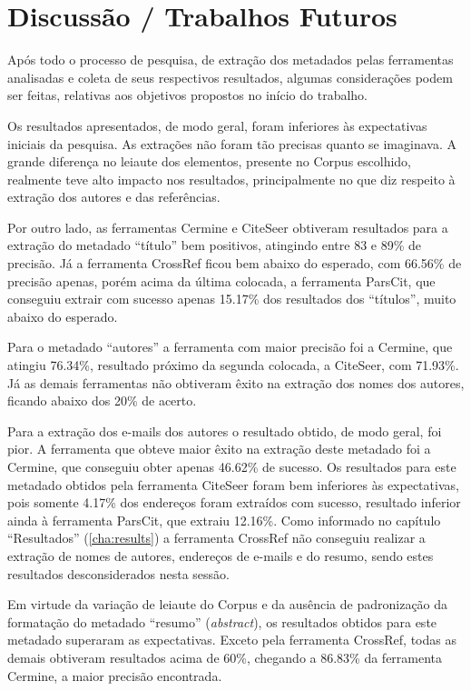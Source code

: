 
\chapter{Discussão / Trabalhos Futuros} %
\label{cha:conclusion}

Após todo o processo de pesquisa, de extração dos metadados pelas ferramentas analisadas e coleta de seus respectivos resultados, algumas considerações podem ser feitas, relativas aos objetivos propostos no início do trabalho.

Os resultados apresentados, de modo geral, foram inferiores às expectativas iniciais da pesquisa. As extrações não foram tão precisas quanto se imaginava. A grande diferença no leiaute dos elementos, presente no Corpus escolhido, realmente teve alto impacto nos resultados, principalmente no que diz respeito à extração dos autores e das referências.

Por outro lado, as ferramentas Cermine e CiteSeer obtiveram resultados para a extração do metadado ``título'' bem positivos, atingindo entre 83 e 89\% de precisão. Já a ferramenta CrossRef ficou bem abaixo do esperado, com 66.56\% de precisão apenas, porém acima da última colocada, a ferramenta ParsCit, que conseguiu extrair com sucesso apenas 15.17\% dos resultados dos ``títulos'', muito abaixo do esperado.

Para o metadado ``autores'' a ferramenta com maior precisão foi a Cermine, que atingiu 76.34\%, resultado próximo da segunda colocada, a CiteSeer, com 71.93\%. Já as demais ferramentas não obtiveram êxito na extração dos nomes dos autores, ficando abaixo dos 20\% de acerto.

Para a extração dos e-mails dos autores o resultado obtido, de modo geral, foi pior. A ferramenta que obteve maior êxito na extração deste metadado foi a Cermine, que conseguiu obter apenas 46.62\% de sucesso. Os resultados para este metadado obtidos pela ferramenta CiteSeer foram bem inferiores às expectativas, pois somente 4.17\% dos endereços foram extraídos com sucesso, resultado inferior ainda à ferramenta ParsCit, que extraiu 12.16\%. Como informado no capítulo ``Resultados'' (\autoref{cha:results}) a ferramenta CrossRef não conseguiu realizar a extração de nomes de autores, endereços de e-mails e do resumo, sendo estes resultados desconsiderados nesta sessão.

Em virtude da variação de leiaute do Corpus e da ausência de padronização da formatação do metadado ``resumo'' (\emph{abstract}), os resultados obtidos para este metadado superaram as expectativas. Exceto pela ferramenta CrossRef, todas as demais obtiveram resultados acima de 60\%, chegando a 86.83\% da ferramenta Cermine, a maior precisão encontrada. 

